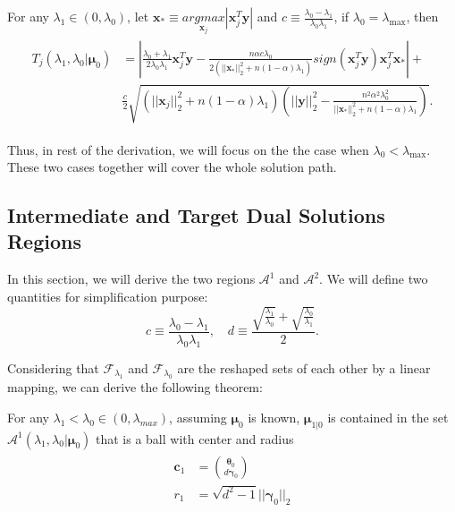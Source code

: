 \begin{theorem}
    \label{thm:0.1}
    For any $\lambda_1\in(0,\lambda_{0})$, let $\boldsymbol x_*\equiv\underset{\boldsymbol x_j}{argmax}|\boldsymbol x_j^T\boldsymbol y|$ and $c\equiv \frac{\lambda_{0}-\lambda_1}{\lambda_{0}\lambda_1}$, if $\lambda_0=\lambda_{\max}$, then
    \begin{gather}
        \begin{aligned}
            T_j(\lambda_{1},\lambda_{0}|\boldsymbol\mu_0)&=\left|\frac{\lambda_{0}+\lambda_1}{2\lambda_{0}\lambda_1}\boldsymbol x_j^T\boldsymbol y-\frac{n\alpha c\lambda_{0}}{2(||\boldsymbol x_*||_2^2+n(1-\alpha)\lambda_1)}\textit{sign}(\boldsymbol x_j^T\boldsymbol y) \boldsymbol x_j^T\boldsymbol x_*\right|+\\
            &\frac{c}{2}\sqrt{\left(||\boldsymbol x_j||_2^2+n(1-\alpha)\lambda_1\right)\left(||\boldsymbol y||_2^2-\frac{n^2\alpha^2\lambda_{0}^2}{||\boldsymbol x_*||_2^2+n(1-\alpha)\lambda_1}\right)}.
        \end{aligned}
    \end{gather}
\end{theorem}
Thus, in rest of the derivation, we will focus on the the case when $\lambda_0<\lambda_{\max}$. These two cases together will cover the whole solution path.

\subsection{Intermediate and Target Dual Solutions Regions}

In this section, we will derive the two regions $\mathcal{A}^1$ and $\mathcal{A}^2$. We will define two quantities for simplification purpose: 
\begin{equation}
    c\equiv\frac{\lambda_0-\lambda_1}{\lambda_0\lambda_1},\quad d\equiv \frac{\sqrt{\frac{\lambda_1}{\lambda_0}}+\sqrt{\frac{\lambda_0}{\lambda_1}}}{2}.
\end{equation}

Considering that $\mathcal{F}_{\lambda_1}$ and $\mathcal{F}_{\lambda_0}$ are the reshaped sets of each other by a linear mapping, we can derive the following theorem:

\begin{theorem}
    \label{thm:1.1}
    For any $\lambda_1<\lambda_{0}\in (0,\lambda_{max})$, assuming $\boldsymbol\mu_0$ is known, $\boldsymbol\mu_{1|0}$ is contained in the set $\mathcal{A}^1(\lambda_1,\lambda_0|\boldsymbol\mu_0)$ that is a ball with center and radius
    \begin{gather}
        \begin{aligned}
            \boldsymbol c_1&=\binom{\boldsymbol\theta_0}{d\boldsymbol\gamma_0}\\
            r_1&=\sqrt{d^2-1}||\boldsymbol\gamma_0||_2
        \end{aligned}
    \end{gather}
\end{theorem}


